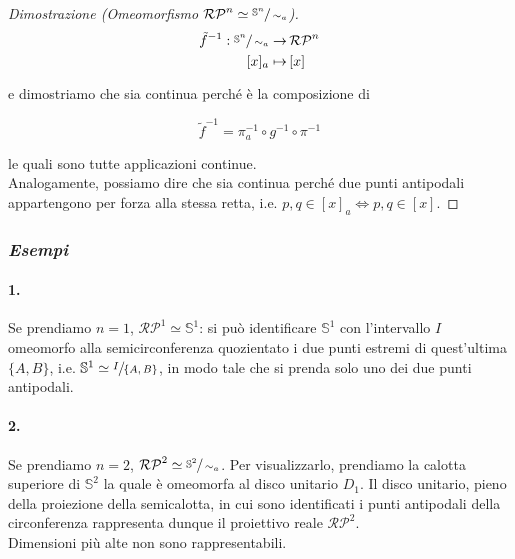 \begin{proof}[Dimostrazione (Omeomorfismo $ \mathcal{RP}^{n} \simeq \sfrac{\mathbb{S}^{n}}{\sim_{a}} $)]
	\begin{align}
		\begin{split}
			\tilde{f}^{-1} : \sfrac{\mathbb{S}^{n}}{\sim_{a}} \to& \, \mathcal{RP}^{n}\\
			[x]_{a} \mapsto& \, [x]
		\end{split}
	\end{align}

	e dimostriamo che sia continua perché è la composizione di
	
	\begin{equation}
		\tilde{f}^{-1} = \pi_{a}^{-1} \circ g^{-1} \circ \pi^{-1}
	\end{equation}

	le quali sono tutte applicazioni continue.\\
	Analogamente, possiamo dire che sia continua perché due punti antipodali appartengono per forza alla stessa retta, i.e. $ p,q \in [x]_{a} \iff p,q \in [x] $.
\end{proof}

\subsubsection{\textit{Esempi}}

\paragraph{1.}

Se prendiamo $ n=1 $, $ \mathcal{RP}^{1} \simeq \mathbb{S}^{1} $: si può identificare $ \mathbb{S}^{1} $ con l'intervallo $ I $ omeomorfo alla semicirconferenza quozientato i due punti estremi di quest'ultima $ \{A,B\} $, i.e. $ \mathbb{S}^{1} \simeq \sfrac{I}{\{A,B\}} $, in modo tale che si prenda solo uno dei due punti antipodali.

\paragraph{2.}

Se prendiamo $ n=2 $, $ \mathcal{RP}^{2} \simeq \sfrac{\mathbb{S}^{2}}{\sim_{a}} $. Per visualizzarlo, prendiamo la calotta superiore di $ \mathbb{S}^{2} $ la quale è omeomorfa al disco unitario $ D_{1} $. Il disco unitario, pieno della proiezione della semicalotta, in cui sono identificati i punti antipodali della circonferenza rappresenta dunque il proiettivo reale $ \mathcal{RP}^{2} $.\\
Dimensioni più alte non sono rappresentabili.

